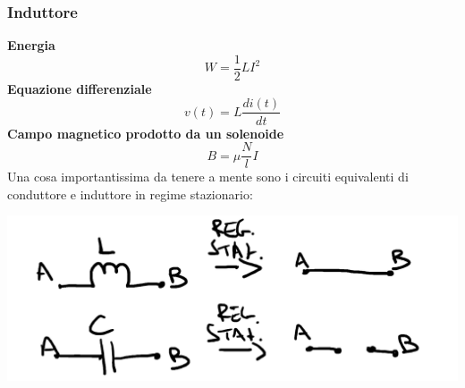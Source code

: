 \documentclass{article}
\begin{document}
\subsubsection{Induttore}
\textbf{Energia}
\[
    W = \frac{1}{2}LI^2
\]
\textbf{Equazione differenziale}
\[
    v(t) = L \frac{di(t)}{dt}
\]
\textbf{Campo magnetico prodotto da un solenoide}
\[
    B = \mu  \frac{N}{l}  I
\]
Una cosa importantissima da tenere a mente sono i circuiti equivalenti di conduttore e induttore in regime stazionario:
\begin{center}
    \includegraphics[scale=0.2]{Image/Es_4_Trans_1.png}
\end{center}
\end{document}

